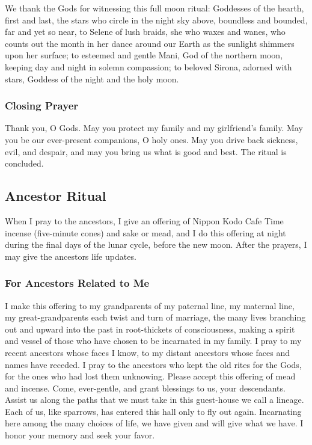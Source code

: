 \documentclass[
]{book}
\begin{document}
We thank the Gods for witnessing this full moon ritual:
Goddesses of the hearth, first and last,
the stars who circle in the night sky above,
boundless and bounded, far and yet so near,
to Selene of lush braids,
she who waxes and wanes,
who counts out the month in her dance
around our Earth as the sunlight shimmers upon her surface;
to esteemed and gentle Mani,
God of the northern moon,
keeping day and night in solemn compassion;
to beloved Sirona, adorned with stars,
Goddess of the night and the holy moon.

\hypertarget{closing-prayer-2}{%
\subsubsection{Closing Prayer}\label{closing-prayer-2}}

Thank you, O Gods.
May you protect my family and my girlfriend's family.
May you be our ever-present companions, O holy ones.
May you drive back sickness, evil, and despair,
and may you bring us what is good and best.
The ritual is concluded.

\hypertarget{ancestor-ritual}{%
\subsection{Ancestor Ritual}\label{ancestor-ritual}}

When I pray to the ancestors, I give an offering of Nippon Kodo Cafe Time incense (five-minute cones) and sake or mead, and I do this offering at night during the final days of the lunar cycle, before the new moon. After the prayers, I may give the ancestors life updates.

\hypertarget{for-ancestors-related-to-me}{%
\subsubsection{For Ancestors Related to Me}\label{for-ancestors-related-to-me}}

I make this offering to
my grandparents of my paternal line,
my maternal line, my great-grandparents
each twist and turn of marriage,
the many lives branching out and upward
into the past in root-thickets of consciousness,
making a spirit and vessel of those who have chosen
to be incarnated in my family.
I pray to my recent ancestors whose faces I know,
to my distant ancestors whose faces and names have receded.
I pray to the ancestors who kept the old rites for the Gods,
for the ones who had lost them unknowing.
Please accept this offering of mead and incense.
Come, ever-gentle, and grant blessings to us, your descendants.
Assist us along the paths that we must take
in this guest-house we call a lineage.
Each of us, like sparrows, has entered this hall only to fly out again.
Incarnating here among the many choices of life,
we have given and will give what we have.
I honor your memory and seek your favor.
\end{document}
